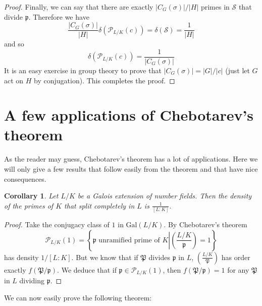 \documentclass[]{amsart}
\newtheorem{coro}{Corollary}
\renewcommand{\S}{\mathcal{S}}
\newcommand{\p}{\mathfrak{p}}
\renewcommand{\P}{\mathfrak{P}}
\newcommand{\PP}{\mathcal{P}}
\newcommand{\Frob}[2]{\left(\frac{#1}{#2}\right )}
\newcommand{\Gal}{\text{Gal}}
\begin{document}
\begin{proof}
			Finally, we can say that there are exactly $|C_G(\sigma)|/|H|$ primes in $\S$ that divide $\p$. Therefore we have
			\[\frac{|C_G(\sigma)|}{|H|}\delta(\PP_{L/K}(c))=\delta(\S)=\frac{1}{|H|}\]
			and so 
			\[\delta(\PP_{L/K}(c))=\frac{1}{|C_G(\sigma)|}\]
			It is an easy exercise in group theory to prove that $|C_G(\sigma)|=|G|/|c|$ (just let $G$ act on $H$ by conjugation). This completes the proof. 
		\end{proof}
		
		\section{A few applications of Chebotarev's theorem}
			As the reader may guess, Chebotarev's theorem has a lot of applications. Here we will only give a few results that follow easily from the theorem and that have nice consequences.
			
			\begin{coro}
				Let $L/K$ be a Galois extension of number fields. Then the density of the primes of $K$ that split completely in $L$ is $\frac{1}{[L:K]}$.
			\end{coro}
			\begin{proof}
				Take the conjugacy class of $1$ in $\Gal(L/K)$. By Chebotarev's theorem
				\[\PP_{L/K}(1)=\left \{\p\text{ unramified prime of }K\left |\Frob{L/K}{\p}=1\right .\right \}\]
				has density $1/[L:K]$. But we know that if $\P$ divides $\p$ in $L$, $\Frob{L/K}{\P}$ has order exactly $f(\P/\p)$. We deduce that if $\p\in\PP_{L/K}(1)$, then $f(\P/\p)=1$ for any $\P$ in $L$ dividing $\p$.
			\end{proof}
			
			We can now easily prove the following theorem:
			
\end{document}
